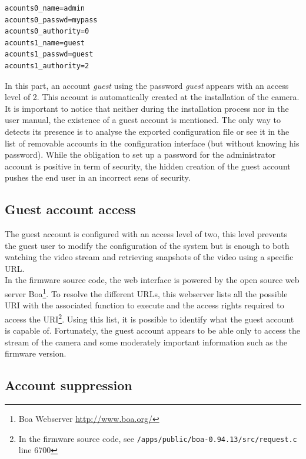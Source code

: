 \begin{verbatim}
acounts0_name=admin
acounts0_passwd=mypass
acounts0_authority=0
acounts1_name=guest
acounts1_passwd=guest
acounts1_authority=2
\end{verbatim}

In this part, an account \emph{guest} using the password \emph{guest} appears with an access level of 2.
This account is automatically created at the installation of the camera.\\

It is important to notice that neither during the installation process nor in the user manual, the existence of a guest account is mentioned.
The only way to detects its presence is to analyse the exported configuration file or see it in the list of removable accounts in the configuration interface (but without knowing his password).
While the obligation to set up a password for the administrator account is positive in term of security, the hidden creation of the guest account pushes the end user in an incorrect sens of security.

\subsection{Guest account access}
\label{sec:dcs-guest-rights}

The guest account is configured with an access level of two, this level prevents the guest user to modify the configuration of the system but is enough to both watching the video stream and retrieving snapshots of the video using a specific URL.\\

In the firmware source code, the web interface is powered by the open source web server Boa\footnote{Boa Webserver \url{http://www.boa.org/}}.
To resolve the different URLs, this webserver lists all the possible URI with the associated function to execute and the access rights required to access the URI\footnote{In the firmware source code, see \texttt{/apps/public/boa-0.94.13/src/request.c} line 6700}.
Using this list, it is possible to identify what the guest account is capable of.
Fortunately, the guest account appears to be able only to access the stream of the camera and some moderately important information such as the firmware version.

\subsection{Account suppression}
\label{sec:dcs-guest-suppression}

